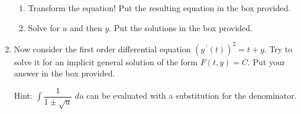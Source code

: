 \documentclass{ximera}
\begin{document}
\begin{enumerate}
\begin{enumerate}
\item  Transform the equation!  Put the resulting equation in the box provided.




\hfill{}\fbox{ \begin{minipage}{2in}\vspace{0.25in}\hfill\vspace{0.25in} \end{minipage}}

\vfill

\item  Solve for $u$ and then $y$.  Put the solutions in the box provided.




\hfill{}



\vfill

\end{enumerate}

\newpage

 \item Now consider the first order differential equation $(y^{\,\prime}(t))^{2}=t+y$.  Try to solve it for an implicit general solution of the form $F(t,y)=C$.  Put your answer in the box provided.

Hint:  $\displaystyle \int\dfrac{1}{1\pm \sqrt{u}}\;du$ can be evaluated with a substitution for the denominator.

\hfill{}

\end{enumerate}
\end{document}
